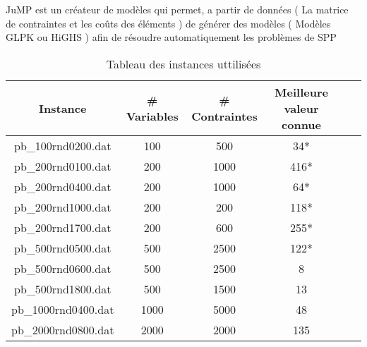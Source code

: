 \noindent
JuMP est un créateur de modèles qui permet, a partir de données ( La matrice de contraintes et les coûts des éléments ) de générer des modèles ( Modèles GLPK ou HiGHS ) afin de résoudre automatiquement les problèmes de SPP


%
%

\vspace{5mm}
\noindent
{}
\vspace{2mm}

\noindent

\begin{table}[ht]
\centering
\begin{tabular}{|c|c|c|c|c|c|}
\hline
\textbf{Instance} & \textbf{\# Variables} & \textbf{\# Contraintes} & \textbf{Meilleure valeur connue} \\ \hline
pb\_100rnd0200.dat  & 100  & 500  & 34* \\ \hline
pb\_200rnd0100.dat  & 200  & 1000 & 416* \\ \hline
pb\_200rnd0400.dat  & 200  & 1000 & 64* \\ \hline
pb\_200rnd1000.dat  & 200  & 200  & 118* \\ \hline
pb\_200rnd1700.dat  & 200  & 600  & 255* \\ \hline
pb\_500rnd0500.dat  & 500  & 2500 & 122* \\ \hline
pb\_500rnd0600.dat  & 500  & 2500 & 8 \\ \hline
pb\_500rnd1800.dat  & 500  & 1500 & 13 \\ \hline
pb\_1000rnd0400.dat & 1000 & 5000 & 48 \\ \hline
pb\_2000rnd0800.dat & 2000 & 2000 & 135 \\ \hline
\end{tabular}
\caption{Tableau des instances uttilisées}
\end{table}

%
%

